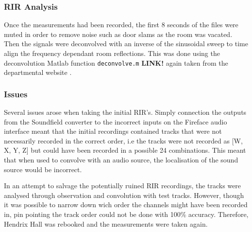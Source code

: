 \documentclass[../../main.tex]{subfiles}
\begin{document}
	\subsubsection{RIR Analysis}

		Once the measurements had been recorded, the first 8 seconds of the files were muted in order to remove noise such as door slams as the room was vacated. Then the signals were deconvolved with an inverse of the sinusoidal sweep to time align the frequency dependant room reflections. This was done using the deconvolution Matlab function \texttt{deconvolve.m} \textbf{LINK!} again taken from the departmental website \cite{sineSweep}.

	\subsubsection{Issues}
		Several issues arose when taking the initial \ac{RIR}'s. Simply connection the outputs from the Soundfield converter to the incorrect inputs on the Fireface audio interface meant that the initial recordings contained tracks that were not necessarily recorded in the correct order, i.e the tracks were not recorded as [W, X, Y, Z] but could have been recorded in a possible 24 combinations. This meant that when used to convolve with an audio source, the localisation of the sound source would be incorrect.


		In an attempt to salvage the potentially ruined \ac{RIR} recordings, the tracks were analysed through observation and convolution with test tracks. However, though it was possible to narrow down wich order the channels might have been recorded in, pin pointing the track order could not be done with 100\% accuracy. Therefore, Hendrix Hall was rebooked and the measurements were taken again.







\end{document}
